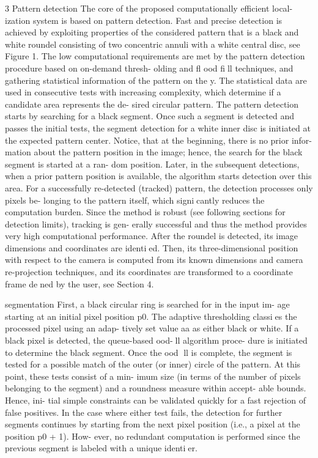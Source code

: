 \documentclass[a4paper]{report}
\begin{document}
3 Pattern detection
The core of the proposed computationally efficient local-
ization system is based on pattern detection. Fast and
precise detection is achieved by exploiting properties of
the considered pattern that is a black and white roundel
consisting of two concentric annuli with a white central
disc, see Figure 1.
The low computational requirements are met by the
pattern detection procedure based on on-demand thresh-
olding and fl
ood fill techniques, and gathering statistical
information of the pattern on the 
y. The statistical data
are used in consecutive tests with increasing complexity,
which determine if a candidate area represents the de-
sired circular pattern.
The pattern detection starts by searching for a black
segment. Once such a segment is detected and passes the
initial tests, the segment detection for a white inner disc
is initiated at the expected pattern center.
Notice, that at the beginning, there is no prior infor-
mation about the pattern position in the image; hence,
the search for the black segment is started at a ran-
dom position. Later, in the subsequent detections, when
a prior pattern position is available, the algorithm starts
detection over this area. For a successfully re-detected
(tracked) pattern, the detection processes only pixels be-
longing to the pattern itself, which signicantly reduces
the computation burden. Since the method is robust (see
following sections for detection limits), tracking is gen-
erally successful and thus the method provides very high
computational performance.
After the roundel is detected, its image dimensions
and coordinates are identied. Then, its three-dimensional
position with respect to the camera is computed from its
known dimensions and camera re-projection techniques,
and its coordinates are transformed to a coordinate frame
dened by the user, see Section 4.

segmentation
First,
a black circular ring is searched for in the input im-
age starting at an initial pixel position p0. The adaptive
thresholding classies the processed pixel using an adap-
tively set value aa as either black or white. If a black pixel
is detected, the queue-based 
ood-ll algorithm proce-
dure is initiated to determine the black segment.
Once the 
ood ll is complete, the segment is tested
for a possible match of the outer (or inner) circle of
the pattern. At this point, these tests consist of a min-
imum size (in terms of the number of pixels belonging
to the segment) and a roundness measure within accept-
able bounds.
Hence, ini-
tial simple constraints can be validated quickly for a fast
rejection of false positives.
In the case where either test fails, the detection for
further segments continues by starting from the next
pixel position (i.e., a pixel at the position p0 + 1). How-
ever, no redundant computation is performed since the
previous segment is labeled with a unique identier.
\end{document}
